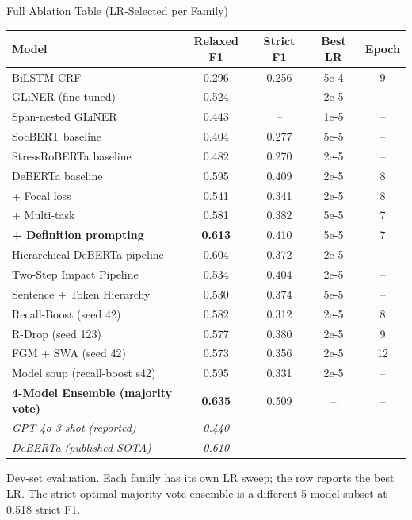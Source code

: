 \documentclass[aspectratio=169,10pt]{beamer}
\newcommand{\ours}{\textcolor{good}{\textbf{0.635}}}
\newcommand{\bestsingle}{\textcolor{good}{\textbf{0.613}}}
\begin{document}
\begin{frame}{Full Ablation Table (LR-Selected per Family)}
  \centering\tiny
  \begin{tabular}{lcccc}
    \toprule
    Model & Relaxed F1 & Strict F1 & Best LR & Epoch \\
    \midrule
    BiLSTM-CRF & 0.296 & 0.256 & 5e-4 & 9 \\
    GLiNER (fine-tuned) & 0.524 & -- & 2e-5 & -- \\
    \quad Span-nested GLiNER & 0.443 & -- & 1e-5 & -- \\
    SocBERT baseline & 0.404 & 0.277 & 5e-5 & -- \\
    StressRoBERTa baseline & 0.482 & 0.270 & 2e-5 & -- \\
    DeBERTa baseline & 0.595 & 0.409 & 2e-5 & 8 \\
    \quad + Focal loss & 0.541 & 0.341 & 2e-5 & 8 \\
    \quad + Multi-task & 0.581 & 0.382 & 5e-5 & 7 \\
    \textbf{\quad + Definition prompting} & \bestsingle & 0.410 & 5e-5 & 7 \\
    Hierarchical DeBERTa pipeline & 0.604 & 0.372 & 2e-5 & -- \\
    Two-Step Impact Pipeline & 0.534 & 0.404 & 2e-5 & -- \\
    Sentence + Token Hierarchy & 0.530 & 0.374 & 5e-5 & -- \\
    Recall-Boost (seed 42) & 0.582 & 0.312 & 2e-5 & 8 \\
    R-Drop (seed 123) & 0.577 & 0.380 & 2e-5 & 9 \\
    FGM + SWA (seed 42) & 0.573 & 0.356 & 2e-5 & 12 \\
    Model soup (recall-boost s42) & 0.595 & 0.331 & 2e-5 & -- \\
    \rowcolor{good!15}
    \textbf{4-Model Ensemble (majority vote)} & \ours & 0.509 & -- & -- \\
    \midrule
    \textit{GPT-4o 3-shot (reported)} & \textit{0.440} & -- & -- & -- \\
    \textit{DeBERTa (published SOTA)} & \textit{0.610} & -- & -- & -- \\
    \bottomrule
  \end{tabular}
  \vfill
  \footnotesize Dev-set evaluation. Each family has its own LR sweep; the row reports the best LR. The strict-optimal majority-vote ensemble is a different 5-model subset at 0.518 strict F1.
\end{frame}
\end{document}
